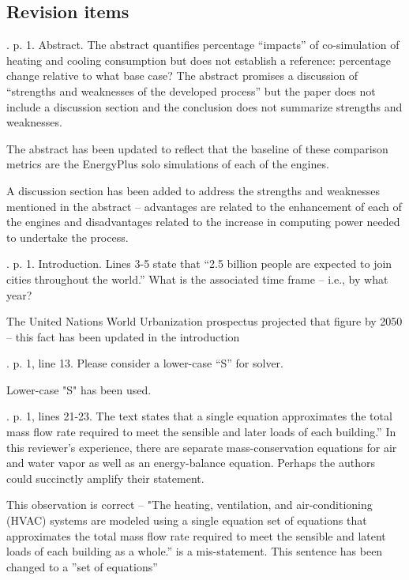 \documentclass[answers,12pt]{exam}
\begin{document}
\subsection{Revision items}
\begin{questions}

. p. 1.  Abstract.  The abstract quantifies percentage “impacts” of co-simulation of heating and cooling consumption but does not establish a reference: percentage change relative to what base case?  The abstract promises a discussion of “strengths and weaknesses of the developed process” but the paper does not include a discussion section and the conclusion does not summarize strengths and weaknesses. 
\begin{solution}
The abstract has been updated to reflect that the baseline of these comparison metrics are the EnergyPlus solo simulations of each of the engines.

A discussion section has been added to address the strengths and weaknesses mentioned in the abstract -- advantages are related to the enhancement of each of the 
engines and disadvantages related to the increase in computing power needed to undertake the process.
\end{solution}

. p. 1. Introduction. Lines 3-5 state that “2.5 billion people are expected to join cities throughout the world.” What is the associated time frame – i.e., by what year? 
\begin{solution}
The United Nations World Urbanization prospectus projected that figure by 2050 -- this fact has been updated in the introduction
\end{solution}

. p. 1, line 13. Please consider a lower-case “S” for solver.   
\begin{solution}
Lower-case "S" has been used.
\end{solution}

. p. 1, lines 21-23.  The text states that a single equation approximates the total mass flow rate required to meet the sensible and later loads of each building.”  In this reviewer’s experience, there are separate mass-conservation equations for air and water vapor as well as an energy-balance equation.  Perhaps the authors could succinctly amplify their statement. 
\begin{solution}
This observation is correct -- "The heating, ventilation, and air-conditioning (HVAC) systems are modeled using a single equation set of equations that approximates the total mass flow rate required to meet the sensible and latent loads of each building as a whole.'' is a mis-statement. This sentence has been changed to a ''set of equations''
\end{solution}


\end{questions}
\end{document}

